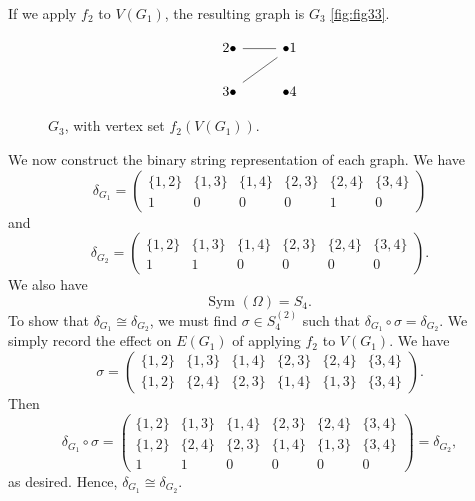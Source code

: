 \begin{example}
If we apply $f_2$ to $V(G_1)$, the resulting graph is $G_3$ \ref{fig:fig33}.
\begin{figure}
\[\begin{tikzcd}
	2\bullet & {\bullet 1} \\
	3\bullet & {\bullet 4}
	\arrow[no head, from=1-1, to=1-2]
	\arrow[no head, from=1-2, to=2-1]
\end{tikzcd}\]
\caption{$G_3$, with vertex set $f_2(V(G_1))$.}
\end{figure}\label{fig:fig33}
We now construct the binary string representation of each graph. We have \[\delta_{G_1}=\begin{pmatrix}\{1,2\}&\{1,3\}&\{1,4\}&\{2,3\}&\{2,4\}&\{3,4\}\\
1&0&0&0&1&0
\end{pmatrix}\] and 
\[\delta_{G_2}=\begin{pmatrix}\{1,2\}&\{1,3\}&\{1,4\}&\{2,3\}&\{2,4\}&\{3,4\}\\
1&1&0&0&0&0
\end{pmatrix}.\] We also have
\[\text{Sym }(\Omega)=S_4.\]
To show that $\delta_{G_1}\cong\delta_{G_2}$, we must find $\sigma\in S_4^{(2)}$ such that $\delta_{G_1}\circ \sigma =\delta_{G_2}$. We simply record the effect on $E(G_1)$ of applying $f_2$ to $V(G_1)$. We have
\[\sigma =\begin{pmatrix}\{1,2\}&\{1,3\}&\{1,4\}&\{2,3\}&\{2,4\}&\{3,4\}\\
\{1,2\}&\{2,4\}&\{2,3\}&\{1,4\}&\{1,3\}&\{3,4\}
\end{pmatrix}.\]
Then 
\[\delta_{G_1}\circ \sigma=\begin{pmatrix}\{1,2\}&\{1,3\}&\{1,4\}&\{2,3\}&\{2,4\}&\{3,4\}\\
\{1,2\}&\{2,4\}&\{2,3\}&\{1,4\}&\{1,3\}&\{3,4\}\\
1&1&0&0&0&0
\end{pmatrix}=\delta_{G_2},\]
as desired. Hence, $\delta_{G_1}\cong\delta_{G_2}$.
\end{example}

